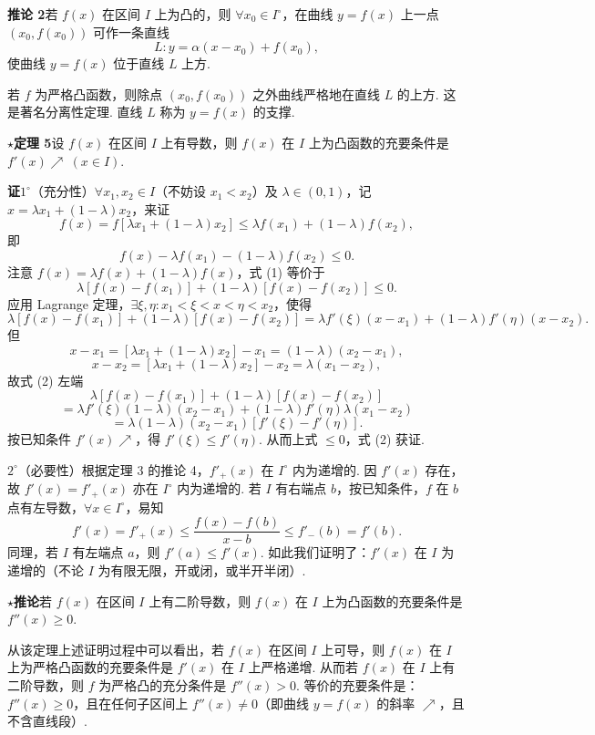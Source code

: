 \documentclass[UTF8, 12pt, fontset=fandol, oneside]{ctexart}
\begin{document}
\noindent\textbf{推论 2}\quad 若 $f(x)$ 在区间 $I$ 上为凸的，则 $\forall x_0\in I^\circ$，在曲线 $y=f(x)$ 上一点 $(x_0,f(x_0))$ 可作一条直线
\[
  L:y=\alpha(x-x_0)+f(x_0),
\]
使曲线 $y=f(x)$ 位于直线 $L$ 上方.

若 $f$ 为严格凸函数，则除点 $(x_0,f(x_0))$ 之外曲线严格地在直线 $L$ 的上方. 这是著名分离性定理. 直线 $L$ 称为 $y=f(x)$ 的支撑.

\noindent\textbf{$\star$定理 5}\quad 设 $f(x)$ 在区间 $I$ 上有导数，则 $f(x)$ 在 $I$ 上为凸函数的充要条件是 $f'(x)\nearrow\ (x\in I)$.

\noindent\textbf{证}\quad $1^\circ$（充分性）$\forall x_1,x_2\in I$（不妨设 $x_1<x_2$）及 $\lambda\in(0,1)$，记 $x=\lambda x_1+(1-\lambda)x_2$，来证
\[
  f(x)=f[\lambda x_1+(1-\lambda)x_2]\le \lambda f(x_1)+(1-\lambda)f(x_2),
\]
即
\[
  f(x)-\lambda f(x_1)-(1-\lambda)f(x_2)\le0. \tag{1}
\]
注意 $f(x)=\lambda f(x)+(1-\lambda)f(x)$，式 (1) 等价于
\[
  \lambda[f(x)-f(x_1)]+(1-\lambda)[f(x)-f(x_2)]\le0. \tag{2}
\]
应用 Lagrange 定理，$\exists\xi,\eta:x_1<\xi<x<\eta<x_2$，使得
\[
  \lambda[f(x)-f(x_1)]+(1-\lambda)[f(x)-f(x_2)]
  =\lambda f'(\xi)(x-x_1)+(1-\lambda)f'(\eta)(x-x_2).
\]
但
\[
  x-x_1=[\lambda x_1+(1-\lambda)x_2]-x_1=(1-\lambda)(x_2-x_1),
\]
\[
  x-x_2=[\lambda x_1+(1-\lambda)x_2]-x_2=\lambda(x_1-x_2),
\]
故式 (2) 左端
\[
  \lambda[f(x)-f(x_1)]+(1-\lambda)[f(x)-f(x_2)]
\]
\[
  =\lambda f'(\xi)(1-\lambda)(x_2-x_1)
  +(1-\lambda)f'(\eta)\lambda(x_1-x_2)
\]
\[
  =\lambda(1-\lambda)(x_2-x_1)[f'(\xi)-f'(\eta)]. \tag{3}
\]
按已知条件 $f'(x)\nearrow$，得 $f'(\xi)\le f'(\eta)$. 从而上式 $\le0$，式 (2) 获证.

$2^\circ$（必要性）根据定理 3 的推论 4，$f'_+(x)$ 在 $I^\circ$ 内为递增的. 因 $f'(x)$ 存在，故 $f'(x)=f'_+(x)$ 亦在 $I^\circ$ 内为递增的. 若 $I$ 有右端点 $b$，按已知条件，$f$ 在 $b$ 点有左导数，$\forall x\in I^\circ$，易知
\[
  f'(x)=f'_+(x)\le \frac{f(x)-f(b)}{x-b}\le f'_-(b)=f'(b).
\]
同理，若 $I$ 有左端点 $a$，则 $f'(a)\le f'(x)$. 如此我们证明了：$f'(x)$ 在 $I$ 为递增的（不论 $I$ 为有限无限，开或闭，或半开半闭）.

\noindent\textbf{$\star$推论}\quad 若 $f(x)$ 在区间 $I$ 上有二阶导数，则 $f(x)$ 在 $I$ 上为凸函数的充要条件是 $f''(x)\ge0$.

从该定理上述证明过程中可以看出，若 $f(x)$ 在区间 $I$ 上可导，则 $f(x)$ 在 $I$ 上为严格凸函数的充要条件是 $f'(x)$ 在 $I$ 上严格递增. 从而若 $f(x)$ 在 $I$ 上有二阶导数，则 $f$ 为严格凸的充分条件是 $f''(x)>0$. 等价的充要条件是：$f''(x)\ge0$，且在任何子区间上 $f''(x)\ne0$（即曲线 $y=f(x)$ 的斜率 $\nearrow$，且不含直线段）.
\end{document}
